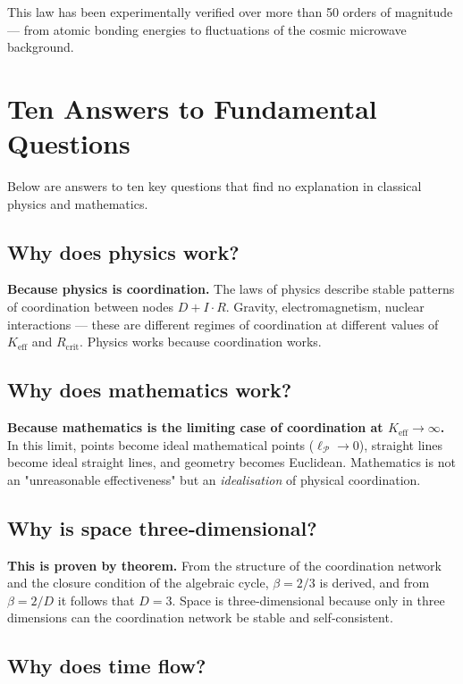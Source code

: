 \documentclass[12pt,a4paper]{article}
\newcommand{\Keff}{K_{\mathrm{eff}}}
\newcommand{\betaf}{\beta}
\newcommand{\Rcrit}{R_{\mathrm{crit}}}
\newcommand{\calP}{\mathcal{P}}
\begin{document}
	This law has been experimentally verified over more than 50 orders of magnitude — from atomic bonding energies to fluctuations of the cosmic microwave background.
	
	\section{Ten Answers to Fundamental Questions}
	
	Below are answers to ten key questions that find no explanation in classical physics and mathematics.
	
	\subsection{Why does physics work?}
	
	\textbf{Because physics is coordination.} The laws of physics describe stable patterns of coordination between nodes \(D+I\cdot R\). Gravity, electromagnetism, nuclear interactions — these are different regimes of coordination at different values of \(\Keff\) and \(\Rcrit\). Physics works because coordination works.
	
	\subsection{Why does mathematics work?}
	
	\textbf{Because mathematics is the limiting case of coordination at \(\Keff \to \infty\).} In this limit, points become ideal mathematical points (\(\ell_{\calP} \to 0\)), straight lines become ideal straight lines, and geometry becomes Euclidean. Mathematics is not an "unreasonable effectiveness" but an \emph{idealisation} of physical coordination.
	
	\subsection{Why is space three‑dimensional?}
	
	\textbf{This is proven by theorem.} From the structure of the coordination network and the closure condition of the algebraic cycle, \(\betaf = 2/3\) is derived, and from \(\betaf = 2/D\) it follows that \(D=3\). Space is three‑dimensional because only in three dimensions can the coordination network be stable and self‑consistent.
	
	\subsection{Why does time flow?}
	
\end{document}
